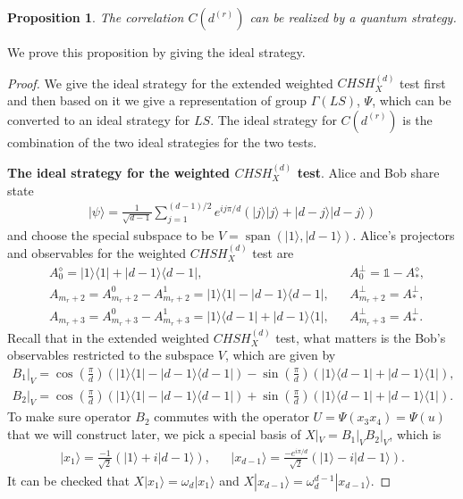 \documentclass[11pt,letterpaper]{article}
\newcommand{\ket}[1]{|#1\rangle}
\newcommand{\ketbra}[2]{|#1\rangle\langle#2|}
\DeclareMathOperator{\spn}{span}
\newcommand{\1}{\mathbb{1}}
\newcommand{\CHSH}{CHSH^{(d)}}
\newcommand{\LS}{LS}
\newcommand{\dr}[1]{d^{(#1)}}
\newtheorem{proposition}[theorem]{Proposition}
\theoremstyle{definition}
\begin{document}
\begin{proposition}
	\label{prop:realize}
	The correlation $C(\dr{r})$ can be realized by a quantum strategy.
\end{proposition}
We prove this proposition by giving the ideal strategy.
\begin{proof}
We give the ideal strategy for the extended weighted $\CHSH_X$ test first and then based on it we give a representation of 
group $\Gamma(\LS)$, $\Psi$, which can be converted to an ideal strategy for $\LS$. 
The ideal strategy for $C(\dr{r})$ is the combination of the two ideal strategies for the two tests.

\textbf{The ideal strategy for the weighted $\CHSH_X$ test}.
Alice and Bob share state 
\begin{align}
	\ket{\psi} = \frac{1}{\sqrt{d-1}}\sum_{j=1}^{(d-1)/2} e^{ij\pi/d}(\ket{j}\ket{j} + \ket{d-j}\ket{d-j})
\end{align}	
and choose the special subspace to be 
$V = \spn(\ket{1} ,\ket{d-1})$.
Alice's projectors and observables for the weighted $\CHSH_X$ test are
\begin{align*}
	&A_0^\diamond = \ketbra{1}{1} + \ketbra{d-1}{d-1}, &&A_0^\perp = \1 - A_\ast^\diamond, \\
	&A_{m_r+2} = A_{m_r+2}^0-A_{m_r+2}^1 = \ketbra{1}{1} - \ketbra{d-1}{d-1}, &&A_{m_r+2}^\perp = A_\ast^\perp,\\
	&A_{m_r+3} = A_{m_r+3}^0-A_{m_r+3}^1 = \ketbra{1}{d-1} + \ketbra{d-1}{1} ,&&A_{m_r+3}^\perp = A_\ast^\perp.
\end{align*}
Recall that in the extended weighted $\CHSH_X$ test, what matters is the 
Bob's observables restricted to the subspace $V$, which are given by
\begin{align*}
	B_1|_V = \cos(\frac{\pi}{d})(\ketbra{1}{1} - \ketbra{d-1}{d-1}) - \sin(\frac{\pi}{d})(\ketbra{1}{d-1} + \ketbra{d-1}{1}),\\
	B_2|_V = \cos(\frac{\pi}{d})(\ketbra{1}{1} - \ketbra{d-1}{d-1}) +\sin(\frac{\pi}{d})(\ketbra{1}{d-1} + \ketbra{d-1}{1}).
\end{align*}
To make sure operator $B_2$ commutes with the operator $U = \Psi(x_3x_4) = \Psi(u)$ that we will construct later, we pick a 
special basis of $X|_V =B_1|_VB_2|_V$, which is
\begin{align}
	\ket{x_1} = \frac{-1}{\sqrt{2}}(\ket{1} + i\ket{d-1}), &&
	\ket{x_{d-1}} = \frac{-e^{i\pi/d}}{\sqrt{2}}(\ket{1} - i\ket{d-1}).
\end{align}
It can be checked that $X\ket{x_1} = \omega_d \ket{x_1}$ and $X\ket{x_{d-1}} = \omega_d^{d-1} \ket{x_{d-1}}$.

\end{proof}
\end{document}
